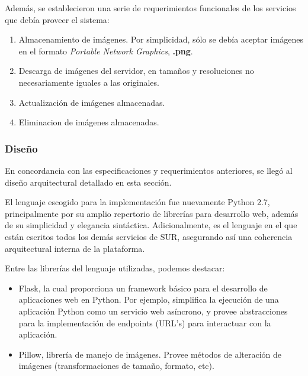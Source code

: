 \documentclass[11pt,letterpaper]{article}
\begin{document}
Además, se establecieron una serie de requerimientos funcionales de los servicios que debía proveer el sistema:
\begin{enumerate}
    \item Almacenamiento de imágenes. Por simplicidad, sólo se debía aceptar imágenes en el formato \emph{Portable Network Graphics}, \textbf{.png}.
    \item Descarga de imágenes del servidor, en tamaños y resoluciones no necesariamente iguales a las originales.
    \item Actualización de imágenes almacenadas.
    \item Eliminacion de imágenes almacenadas.
\end{enumerate}

\subsubsection{Diseño}

En concordancia con las especificaciones y requerimientos anteriores, se llegó al diseño arquitectural detallado en esta sección.

El lenguaje escogido para la implementación fue nuevamente Python 2.7, principalmente por su amplio repertorio de librerías para desarrollo web, además de su simplicidad y elegancia sintáctica. Adicionalmente, es el lenguaje en el que están escritos todos los demás servicios de SUR, asegurando así una coherencia arquitectural interna de la plataforma.

Entre las librerías del lenguaje utilizadas, podemos destacar:
\begin{itemize}
    \item Flask\cite{flask}, la cual proporciona un framework básico para el desarrollo de aplicaciones web en Python. Por ejemplo, simplifica la ejecución de una aplicación Python como un servicio web asíncrono, y provee abstracciones para la implementación de endpoints (URL's) para interactuar con la aplicación.
    \item Pillow\cite{pillow}, librería de manejo de imágenes. Provee métodos de alteración de imágenes (transformaciones de tamaño, formato, etc).

\end{itemize}


\newpage
\end{document}
